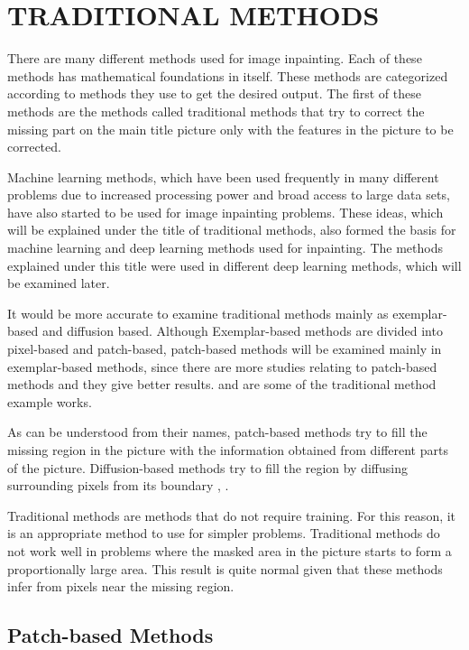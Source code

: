 \chapter{TRADITIONAL METHODS}\label{traditional_methods}

There are many different methods used for image inpainting. Each of these methods has mathematical foundations in itself. These methods are categorized according to methods they use to get the desired output\cite{exemplerinpainting}. The first of these methods are the methods called traditional methods that try to correct the missing part on the main title picture only with the features in the picture to be corrected.

Machine learning methods, which have been used frequently in many different problems due to increased processing power and broad access to large data sets, have also started to be used for image inpainting problems. These ideas, which will be explained under the title of traditional methods, also formed the basis for machine learning and deep learning methods used for inpainting. The methods explained under this title were used in different deep learning methods, which will be examined later.

It would be more accurate to examine traditional methods mainly as exemplar-based and diffusion based. Although Exemplar-based methods are divided into pixel-based and patch-based, patch-based methods will be examined mainly in exemplar-based methods, since there are more studies relating to patch-based methods and they give better results. \cite{trad1} and \cite{trad2} are some of the traditional method example works.

As can be understood from their names, patch-based methods try to fill the missing region in the picture with the information obtained from different parts of the picture. Diffusion-based methods try to fill the region by diffusing surrounding pixels from its boundary \cite{navier_stokes_inpainting}, \cite{telea}.

Traditional methods are methods that do not require training. For this reason, it is an appropriate method to use for simpler problems. Traditional methods do not work well in problems where the masked area in the picture starts to form a proportionally large area. This result is quite normal given that these methods infer from pixels near the missing region.

\section{Patch-based Methods}

